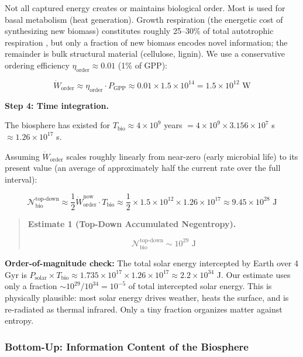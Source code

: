 \documentclass[11pt]{article}
\theoremstyle{plain}
\theoremstyle{definition}
\theoremstyle{remark}
\let\origsubsubsection\subsubsection
\renewcommand{\subsubsection}{\needspace{4\baselineskip}\origsubsubsection}
\begin{document}
Not all captured energy creates or maintains biological order. Most is
used for basal metabolism (heat generation). Growth respiration (the
energetic cost of synthesizing new biomass) constitutes roughly 25--30\%
of total autotrophic respiration \citep{Smil2002}, but only a fraction
of new biomass encodes novel information; the remainder is bulk
structural material (cellulose, lignin). We use a conservative ordering
efficiency \(\eta_{\text{order}} \approx 0.01\) (1\% of GPP):

\[\dot{W}_{\text{order}} \approx \eta_{\text{order}} \cdot P_{\text{GPP}} \approx 0.01 \times 1.5 \times 10^{14} = 1.5 \times 10^{12} \text{ W}\]

\textbf{Step 4: Time integration.}

The biosphere has existed for \(T_{\text{bio}} \approx 4 \times 10^9\)
years \(= 4 \times 10^9 \times 3.156 \times 10^7\) s
\(\approx 1.26 \times 10^{17}\) s.

Assuming \(\dot{W}_{\text{order}}\) scales roughly linearly from
near-zero (early microbial life) to its present value (an average of
approximately half the current rate over the full interval):

\[\mathcal{N}_{\text{bio}}^{\text{top-down}} \approx \frac{1}{2} \dot{W}_{\text{order}}^{\text{now}} \cdot T_{\text{bio}} \approx \frac{1}{2} \times 1.5 \times 10^{12} \times 1.26 \times 10^{17} \approx 9.45 \times 10^{28} \text{ J}\]

\begin{quote}
\textbf{Estimate 1 (Top-Down Accumulated Negentropy).}

\[\mathcal{N}_{\text{bio}}^{\text{top-down}} \sim 10^{29} \text{ J}\]
\end{quote}

\textbf{Order-of-magnitude check:} The total solar energy intercepted by
Earth over 4 Gyr is
\(P_{\text{solar}} \times T_{\text{bio}} \approx 1.735 \times 10^{17} \times 1.26 \times 10^{17} \approx 2.2 \times 10^{34}\)
J. Our estimate uses only a fraction \(\sim 10^{29}/10^{34} = 10^{-5}\)
of total intercepted solar energy. This is physically plausible: most
solar energy drives weather, heats the surface, and is re-radiated as
thermal infrared. Only a tiny fraction organizes matter against entropy.

\subsubsection{Bottom-Up: Information Content of the
Biosphere}\label{bottom-up-information-content-of-the-biosphere}
\end{document}
